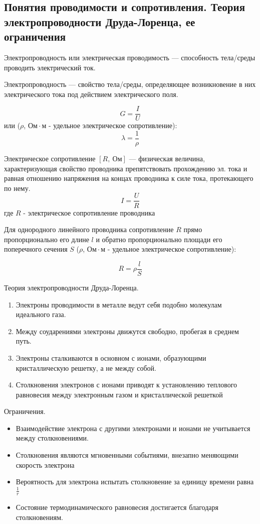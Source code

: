 \subsection{Понятия проводимости и сопротивления. Теория электропроводности Друда-Лоренца, ее ограничения}

\begin{definition}
    Электропроводность или электрическая проводимость — способность тела/среды проводить электрический ток.
\end{definition}

\begin{definition}
    Электропроводность — свойство тела/среды, определяющее возникновение в них электрического тока под действием электрического поля.

    $$
    G=\frac{I}{U}
    $$
    или ($\rho$, $Ом\cdot м$ - удельное электрическое сопротивление):
    $$
    \lambda=\frac{1}{\rho}
    $$
\end{definition}

\begin{definition}
    Электрическое сопротивление $[R,\ Ом]$ — физическая величина, характеризующая свойство проводника препятствовать прохождению эл. тока 
    и равная отношению напряжения на концах проводника к силе тока, протекающего по нему.
    $$
    I=\frac{U}{R}
    $$
    где $R$ - электрическое сопротивление проводника
\end{definition}

Для однородного линейного проводника сопротивление $R$ прямо пропорционально его длине $l$ и обратно пропорционально площади 
его поперечного сечения $S$ ($\rho$, $Ом\cdot м$ - удельное электрическое сопротивление):

$$
R=\rho\frac{l}{S}
$$

\begin{theorem}
Теория электропроводности Друда-Лоренца.
\begin{enumerate}
    \item Электроны проводимости в металле ведут себя подобно молекулам идеального газа.
    \item Между соударениями электроны движутся свободно, пробегая в среднем путь.
    \item Электроны сталкиваются в основном с ионами, образующими кристаллическую решетку, а не между собой.
    \item Столкновения электронов с ионами приводят к установлению теплового равновесия между электронным газом и кристаллической решеткой
\end{enumerate}

Ограничения.
\begin{itemize}
    \item Взаимодействие электрона с другими электронами и ионами не учитывается между столкновениями.
    \item Столкновения являются мгновенными событиями, внезапно меняющими скорость электрона
    \item Вероятность для электрона испытать столкновение за единицу времени равна $\frac{1}{r}$
    \item Состояние термодинамического равновесия достигается благодаря столкновениям.
\end{itemize}
\end{theorem}